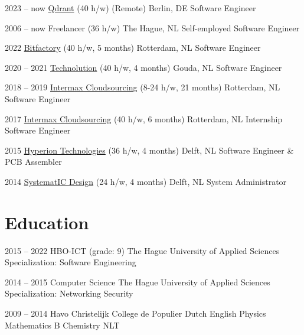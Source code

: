 \documentclass[]{cv-timvisee}
\begin{document}
\begin{entrylist}

\entry
{2023 -- now}
{\href{https://qdrant.tech/}{Qdrant} {\footnotesize\normalfont (40 h/w)}}
{(Remote) Berlin, DE}
{Software Engineer}

\entry
{2006 -- now}
{Freelancer {\footnotesize\normalfont (36 h/w)}}
{The Hague, NL}
{Self-employed Software Engineer}

\entry
{2022}
{\href{https://bitfactory.nl/}{Bitfactory} {\footnotesize\normalfont (40 h/w, 5 months)}}
{Rotterdam, NL}
{Software Engineer}

\entry
{2020 -- 2021}
{\href{https://technolution.eu/}{Technolution} {\footnotesize\normalfont (40 h/w, 4 months)}}
{Gouda, NL}
{Software Engineer}

\entry
{2018 -- 2019}
{\href{https://intermax.nl/}{Intermax Cloudsourcing} {\footnotesize\normalfont (8-24 h/w, 21 months)}}
{Rotterdam, NL}
{Software Engineer}

\entry
{2017}
{\href{https://intermax.nl/}{Intermax Cloudsourcing} {\footnotesize\normalfont (40 h/w, 6 months)}}
{Rotterdam, NL}
{Internship Software Engineer}

\entry
{2015}
{\href{https://hyperiontechnologies.nl/}{Hyperion Technologies} {\footnotesize\normalfont (36 h/w, 4 months)}}
{Delft, NL}
{Software Engineer \& PCB Assembler}

\entry
{2014}
{\href{https://systemat-ic.com/}{SystematIC Design} {\footnotesize\normalfont (24 h/w, 4 months)}}
{Delft, NL}
{System Administrator}

\end{entrylist}


\section{Education}

\begin{entrylist}

\entry
{2015 -- 2022}
{HBO-ICT {\footnotesize\normalfont (grade: 9)}}
{The Hague University of Applied Sciences}
{Specialization: Software Engineering}

\entry
{2014 -- 2015}
{Computer Science}
{The Hague University of Applied Sciences}
{Specialization: Networking \textperiodcentered{} Security}

\entry
{2009 -- 2014}
{Havo}
{Christelijk College de Populier}
{Dutch \textperiodcentered{} English \textperiodcentered{} Physics \textperiodcentered{} Mathematics B \textperiodcentered{} Chemistry \textperiodcentered{} NLT}

\end{entrylist}
\end{document}
